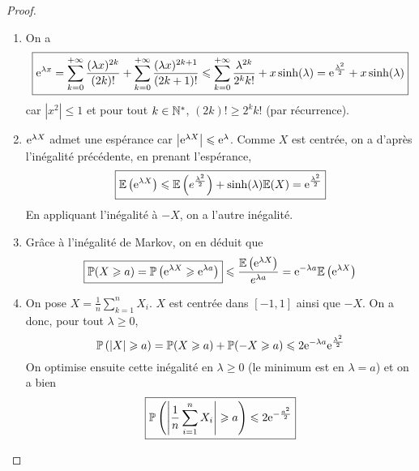 \begin{proof}
    \phantom{}
    \begin{enumerate}
        \item On a 
        \begin{equation}
            \boxed{\mathrm{e}^{\lambda x}=\sum_{k=0}^{+\infty}\frac{(\lambda x)^{2k}}{(2k)!}+\sum_{k=0}^{+\infty}\frac{(\lambda x)^{2k+1}}{(2k+1)!}\leqslant\sum_{k=0}^{+\infty}\frac{\lambda^{2k}}{2^{k}k!}+x\sinh(\lambda)=\mathrm{e}^{\frac{\lambda^{2}}{2}}+x\sinh(\lambda)}
        \end{equation}
        car $\left\lvert x^{2}\right\rvert\leqslant1$ et pour tout $k\in\mathbb{N}^{*}$, $(2k)!\geqslant2^{k}k!$ (par récurrence).

        \item $\mathrm{e}^{\lambda X}$ admet une espérance car $\left\lvert\mathrm{e}^{\lambda X}\right\rvert\leqslant \mathrm{e}^{\lambda}$. Comme $X$ est centrée, on a d'après l'inégalité précédente, en prenant l'espérance,
        \begin{equation}
            \boxed{\mathbb{E}\left(\mathrm{e}^{\lambda X}\right)\leqslant\mathbb{E}\left(e^{\frac{\lambda^{2}}{2}}\right)+\sinh(\lambda)\mathbb{E}(X)=\mathrm{e}^{\frac{\lambda^{2}}{2}}}
        \end{equation}
        En appliquant l'inégalité à $-X$, on a l'autre inégalité.

        \item Grâce à l'inégalité de Markov, on en déduit que 
        \begin{equation}
            \boxed{\mathbb{P}(X\geqslant a)=\mathbb{P}\left(\mathrm{e}^{\lambda X}\geqslant \mathrm{e}^{\lambda a}\right)}\leqslant \frac{\mathbb{E}\left(\mathrm{e}^{\lambda X}\right)}{e^{\lambda a}}=\mathrm{e}^{-\lambda a}\mathbb{E}\left(\mathrm{e}^{\lambda X}\right)
        \end{equation}

        \item On pose $X=\frac{1}{n}\sum_{k=1}^{n}X_{i}$. $X$ est centrée dans $[-1,1]$ ainsi que $-X$. On a donc, pour tout $\lambda\geqslant0$,
        \begin{equation}
            \mathbb{P}\left(\left\lvert X\right\rvert\geqslant a\right)=\mathbb{P}(X\geqslant a)+\mathbb{P}(-X\geqslant a)\leqslant 2\mathrm{e}^{-\lambda a}\mathrm{e}^{\frac{\lambda^{2}}{2}}
        \end{equation}
        On optimise ensuite cette inégalité en $\lambda\geqslant0$ (le minimum est en $\lambda=a$) et on a bien 
        \begin{equation}
            \boxed{\mathbb{P}\left(\left\lvert\frac{1}{n}\sum_{i=1}^{n}X_{i}\right\rvert\geqslant a\right)\leqslant 2\mathrm{e}^{-\frac{a^{2}}{2}}}
        \end{equation}
    \end{enumerate}
\end{proof}

